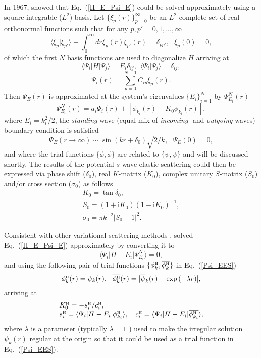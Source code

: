 \documentclass[aip
, pra
, showpacs
, aps
, twocolumn
, groupedaddress
, floatfix
]{revtex4}
\newcommand{\beq}{\begin{equation}}
\newcommand{\eeq}{\end{equation}}
\newcommand{\barr}{\begin{array}}
\newcommand{\earr}{\end{array}}
\newcommand{\phiH}{\phi^{\mbox{\tiny{H}}}}
\begin{document}
In 1967, \citet{Harris67} showed that Eq.~(\ref{H_E_Psi_E}) could be solved
approximately using a square-integrable ($L^2$) basis.
Let $\{\xi_p(r)\}_{p=0}^\infty$ be an $L^2$-complete set of real orthonormal functions
such that for any $p,p'=0,1,...,\infty$
\beq
\langle \xi_p | \xi_{p'} \rangle \equiv \int_0^\infty dr \xi_p(r) \xi_{p'}(r) =\delta_{pp'}, \ \ \ \xi_p(0)=0,
\eeq
of which the first $N$ basis functions are used to diagonalize $H$ arriving at
\beq
\langle \Psi_i |H| \Psi_j \rangle = E_i \delta_{ij} , \ \ \langle \Psi_i | \Psi_j \rangle=\delta_{ij},
\eeq
\beq
\Psi_i(r) = \sum_{p=0}^{N-1} C_{ip} \xi_p(r).
\eeq
Then $\Psi_E(r)$ is approximated at the system's eigenvalues $\{E_i\}_{i=1}^{N}$ by $\Psi^N_{E_i}(r)$
\cite{Harris67}
\beq
\Psi^N_{E_i}(r) = a_i \Psi_i(r)  + [\phi_{k_i}(r)  + K_{0} \overline{\phi}_{k_i}(r)],
\label{Psi_EES} \eeq
where $E_i=k_i^2/2$, the {\em standing}-wave (equal mix of {\em incoming}- and {\em outgoing}-waves) boundary condition is satisfied
\beq
\Psi_E(r \rightarrow \infty) \sim  \sin(kr+\delta_0) \sqrt{2/k}, \ \ \ \Psi_E(0)=0,   \label{stand_wave}
\eeq
and where the trial functions $\{\phi,\overline{\phi}\}$ are related to $\{\psi,\overline{\psi}\}$ and will be discussed shortly.
The results of the potential $s$-wave elastic scattering could then be expressed via
phase shift ($\delta_0$), real $K$-matrix ($K_0$), complex unitary $S$-matrix ($S_{0}$) and/or cross section ($\sigma_{0}$)
as follows
\beq \barr{l}
K_{0} = \tan{\delta_0},\\
S_{0}=(1+\mbox{i}K_0)(1-\mbox{i}K_0)^{-1}, \\
\sigma_{0}=\pi k^{-2} |S_{0}-1|^2.
\earr \eeq


Consistent with other variational scattering methods \cite{Nesbet68},
\citet{Harris67} solved Eq.~(\ref{H_E_Psi_E}) approximately by converting it to 
\beq
\langle\Psi_i|H-E_i|\Psi^N_{E_i}\rangle=0,  \label{EES_ONE_C1}
\eeq
and using the following pair of trial functions $\{\phiH_k, \overline{\phiH_{k}} \}$ in
Eq.~(\ref{Psi_EES})
\beq \barr{l}
\phiH_k(r) =  \psi_k(r),\ \
\overline{\phiH_k}(r) =  [\overline{\psi}_k(r) - \exp{(-\lambda r)}],
\earr \label{def_phi_H} \eeq
arriving at
\beq \barr{l}
K^{\mbox{\tiny{H}}}_{0} = - s^{\mbox{\tiny{H}}}_i / c^{\mbox{\tiny{H}}}_i, \\
s^{\mbox{\tiny{H}}}_i = \langle\Psi_i|H-E_i|  \phiH_{k_i} \rangle, \ \ \
c^{\mbox{\tiny{H}}}_i = \langle\Psi_i|H-E_i|  \overline{\phiH_{k_i}} \rangle,
\earr \label{K_0_Harris} \eeq
where $\lambda$ is a parameter (typically $\lambda=1$ \cite{Nesbet68}) used to make the irregular solution $\overline{\psi}_k(r)$ regular
at the origin so that it could be used as a trial function in Eq.~(\ref{Psi_EES}).
\end{document}
